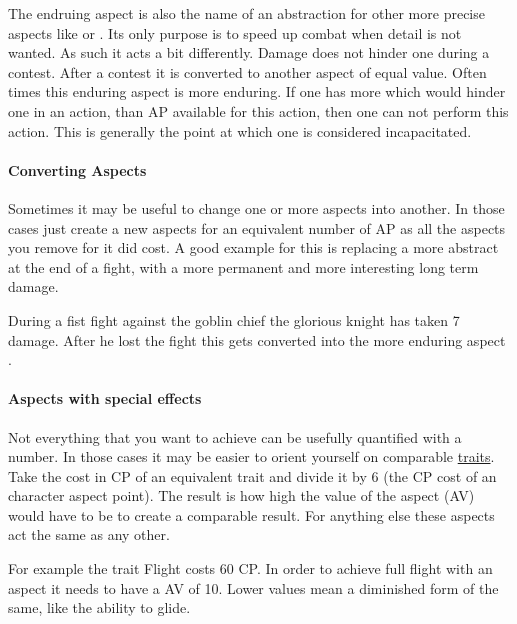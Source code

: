 \documentclass[11pt]{article}
\begin{document}
{The endruing aspect  is also the name of an abstraction for other more precise aspects like  or . Its only purpose is to speed up combat when detail is not wanted. As such it acts a bit differently. Damage does not hinder one during a contest. After a contest it is converted to another aspect of equal value. Often times this enduring aspect is more enduring. If one has more  which would hinder one in an action, than AP available for this action, then one can not perform this action. This is generally the point at which one is considered incapacitated.
\paragraph*{Converting Aspects}
\label{sec:org53c5941}

Sometimes it may be useful to change one or more aspects into another. In those cases just create a new aspects for an equivalent number of AP as all the aspects you remove for it did cost.
A good example for this is replacing a more abstract  at the end of a fight, with a more permanent and more interesting long term damage.

\begin{pwexample}
During a fist fight against the goblin chief the glorious knight has taken 7 damage. After he lost the fight this gets converted into the more enduring aspect . 
\end{pwexample}
\paragraph*{Aspects with special effects}
\label{sec:org0a70b97}

Not everything that you want to achieve can be usefully quantified with a number. In those cases it may be easier to orient yourself on comparable \hyperref[sec:orgc762a3c]{traits}. Take the cost in CP of an equivalent trait and divide it by 6 (the CP cost of an character aspect point). The result is how high the value of the aspect (AV) would have to be to create a comparable result. For anything else these aspects act the same as any other.

For example the trait Flight costs 60 CP. In order to achieve full flight with an aspect it needs to have a AV of 10. Lower values mean a diminished form of the same, like the ability to glide. 
}
\end{document}
